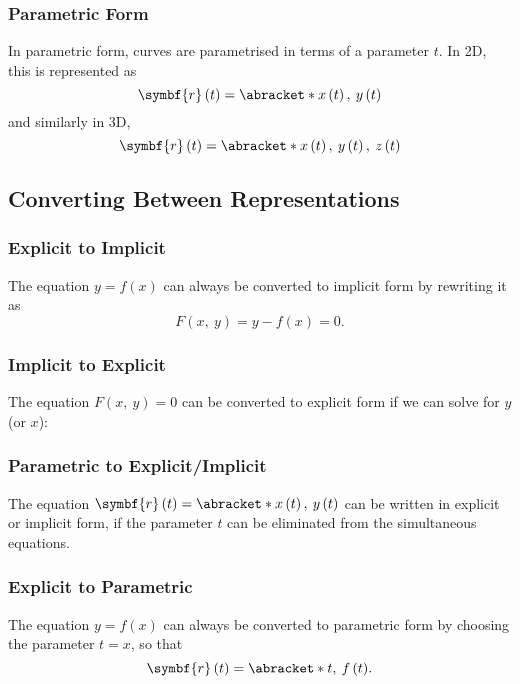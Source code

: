 \documentclass{article}
\begin{document}
\subsubsection{Parametric Form}
In parametric form, curves are parametrised in terms of a parameter
\(t\). In 2D, this is represented as
\begin{equation*}
    \symbf{r}\left( t \right) = \abracket*{x\left( t \right),\: y\left( t \right)}
\end{equation*}
and similarly in 3D,
\begin{equation*}
    \symbf{r}\left( t \right) = \abracket*{x\left( t \right),\: y\left( t \right),\: z\left( t \right)}
\end{equation*}
\subsection{Converting Between Representations}
\subsubsection{Explicit to Implicit}
The equation \(y = f\left( x \right)\) can always be converted to
implicit form by rewriting it as
\begin{equation*}
    F\left( x,\: y \right) = y - f\left( x \right) = 0.
\end{equation*}
\subsubsection{Implicit to Explicit}
The equation \(F\left( x,\: y \right) = 0\) can be converted to
explicit form if we can solve for \(y\) (or \(x\)):
\subsubsection{Parametric to Explicit/Implicit}
The equation \(\symbf{r}\left( t \right) = \abracket*{x\left( t
\right),\: y\left( t \right)}\) can be written in explicit or implicit
form, if the parameter \(t\) can be eliminated from the simultaneous
equations.
\subsubsection{Explicit to Parametric}
The equation \(y = f\left( x \right)\) can always be converted to
parametric form by choosing the parameter \(t = x\), so that
\begin{equation*}
    \symbf{r}\left( t \right) = \abracket*{t,\: f\left( t \right)}.
\end{equation*}
\end{document}
